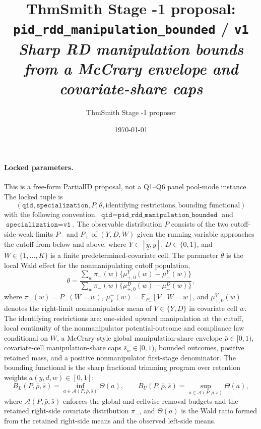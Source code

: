 \documentclass[11pt]{article}
\title{ThmSmith Stage -1 proposal: \texttt{pid\_rdd\_manipulation\_bounded} / \texttt{v1}%
  \\ \large\textit{Sharp RD manipulation bounds from a McCrary envelope and covariate-share caps}}
\author{ThmSmith Stage -1 proposer}
\date{\today}
\newcommand{\E}{\mathbb{E}}
\theoremstyle{definition}
\theoremstyle{plain}
\theoremstyle{remark}
\begin{document}
\maketitle


\paragraph{Locked parameters.}
This is a free-form PartialID proposal, not a Q1--Q6 panel pool-mode instance.
The locked tuple is
\[
  (\texttt{qid}, \texttt{specialization}, P, \theta, \text{identifying restrictions},
    \text{bounding functional})
\]
with the following convention.  \(\texttt{qid}=\texttt{pid\_rdd\_manipulation\_bounded}\) and
\(\texttt{specialization}=\texttt{v1}\).  The observable distribution \(P\) consists of the two
cutoff-side weak limits \(P_-\) and \(P_+\) of \((Y,D,W)\) given the running variable
approaches the cutoff from below and above, where \(Y\in[\underline y,\overline y]\),
\(D\in\{0,1\}\), and \(W\in\{1,\ldots,K\}\) is a finite predetermined-covariate cell.
The parameter \(\theta\) is the local Wald effect for the nonmanipulating cutoff population,
\[
  \theta =
  \frac{\sum_w \pi_-(w)\{\mu^Y_{+,0}(w)-\mu^Y_-(w)\}}
       {\sum_w \pi_-(w)\{\mu^D_{+,0}(w)-\mu^D_-(w)\}},
\]
where \(\pi_-(w)=P_-(W=w)\), \(\mu^-_V(w)=\E_{P_-}[V\mid W=w]\), and
\(\mu^V_{+,0}(w)\) denotes the right-limit nonmanipulator mean of \(V\in\{Y,D\}\)
in covariate cell \(w\).  The identifying restrictions are: one-sided upward manipulation
at the cutoff, local continuity of the nonmanipulator potential-outcome and compliance
law conditional on \(W\), a McCrary-style global manipulation-share envelope
\(\bar\rho\in[0,1)\), covariate-cell manipulation-share caps \(\bar s_w\in[0,1)\),
bounded outcomes, positive retained mass, and a positive nonmanipulator first-stage
denominator.  The bounding functional is the sharp fractional trimming program over
retention weights \(a(y,d,w)\in[0,1]\):
\[
  B_L(P,\bar\rho,\bar s)=\inf_{a\in\mathcal A(P,\bar\rho,\bar s)} \Theta(a),
  \qquad
  B_U(P,\bar\rho,\bar s)=\sup_{a\in\mathcal A(P,\bar\rho,\bar s)} \Theta(a),
\]
where \(\mathcal A(P,\bar\rho,\bar s)\) enforces the global and cellwise removal budgets
and the retained right-side covariate distribution \(\pi_-\), and \(\Theta(a)\) is the Wald
ratio formed from the retained right-side means and the observed left-side means.
\end{document}
